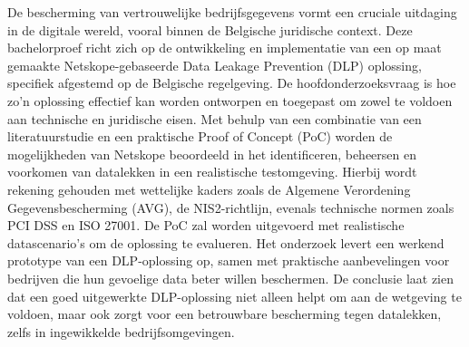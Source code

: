 De bescherming van vertrouwelijke bedrijfsgegevens vormt een cruciale uitdaging in de digitale wereld, 
vooral binnen de Belgische juridische context. 
Deze bachelorproef richt zich op de ontwikkeling en implementatie van een op maat gemaakte Netskope-gebaseerde Data Leakage Prevention (DLP) oplossing, 
specifiek afgestemd op de Belgische regelgeving. 
De hoofdonderzoeksvraag is hoe zo'n oplossing effectief kan worden ontworpen en toegepast om zowel te voldoen aan technische en juridische eisen. 
Met behulp van een combinatie van een literatuurstudie en een praktische Proof of Concept (PoC) worden de mogelijkheden van Netskope beoordeeld in het identificeren, 
beheersen en voorkomen van datalekken in een realistische testomgeving. Hierbij wordt rekening gehouden met wettelijke kaders zoals de 
Algemene Verordening Gegevensbescherming (AVG), de NIS2-richtlijn, evenals technische normen zoals PCI DSS en ISO 27001. 
De PoC zal worden uitgevoerd met realistische datascenario's om de oplossing te evalueren. Het onderzoek levert een werkend prototype van een DLP-oplossing op, 
samen met praktische aanbevelingen voor bedrijven die hun gevoelige data beter willen beschermen. 
De conclusie laat zien dat een goed uitgewerkte DLP-oplossing niet alleen helpt
om aan de wetgeving te voldoen, maar ook zorgt voor een betrouwbare bescherming tegen datalekken, zelfs in ingewikkelde bedrijfsomgevingen.
